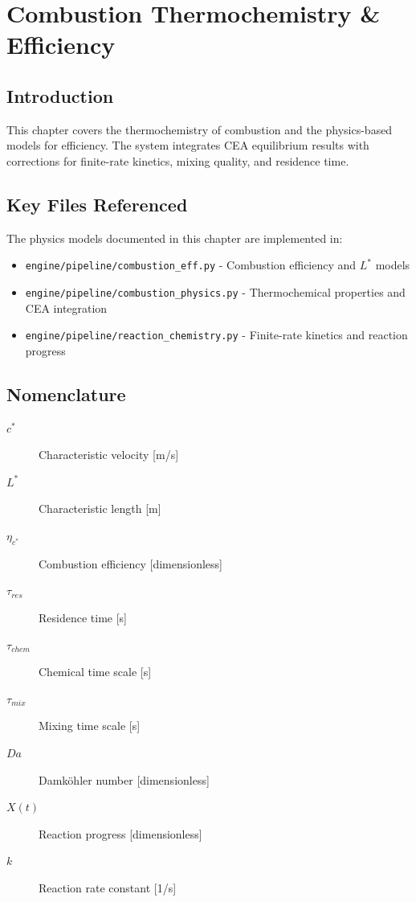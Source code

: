 \section{Combustion Thermochemistry \& Efficiency}

\subsection{Introduction}
This chapter covers the thermochemistry of combustion and the physics-based models for efficiency. The system integrates CEA equilibrium results with corrections for finite-rate kinetics, mixing quality, and residence time.

\subsection{Key Files Referenced}
The physics models documented in this chapter are implemented in:
\begin{itemize}
    \item \texttt{engine/pipeline/combustion_eff.py} - Combustion efficiency and $L^*$ models
    \item \texttt{engine/pipeline/combustion_physics.py} - Thermochemical properties and CEA integration
    \item \texttt{engine/pipeline/reaction_chemistry.py} - Finite-rate kinetics and reaction progress
\end{itemize}

\subsection{Nomenclature}
\begin{description}
    \item[$c^*$] Characteristic velocity [\si{m/s}]
    \item[$L^*$] Characteristic length [\si{m}]
    \item[$\eta_{c^*}$] Combustion efficiency [dimensionless]
    \item[$\tau_{res}$] Residence time [\si{s}]
    \item[$\tau_{chem}$] Chemical time scale [\si{s}]
    \item[$\tau_{mix}$] Mixing time scale [\si{s}]
    \item[$Da$] Damköhler number [dimensionless]
    \item[$X(t)$] Reaction progress [dimensionless]
    \item[$k$] Reaction rate constant [\si{1/s}]
\end{description}

